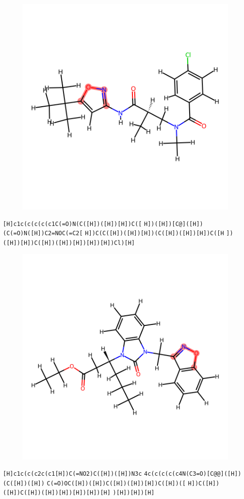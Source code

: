 \documentclass{article}
\begin{document}
\begin{figure}[ht]
\centering
    \includegraphics{mol208.png}
\end{figure}
\verb|[H]c1c(c(c(c(c1C(=O)N(C([H])([H])[H])C([| \verb|H])([H])[C@]([H])(C(=O)N([H])C2=NOC(=C2[| \verb|H])C(C([H])([H])[H])(C([H])([H])[H])C([H| \verb|])([H])[H])C([H])([H])[H])[H])[H])Cl)[H]|

\begin{figure}[ht]
\centering
    \includegraphics{mol209.png}
\end{figure}
\verb|[H]c1c(c(c2c(c1[H])C(=NO2)C([H])([H])N3c| \verb|4c(c(c(c(c4N(C3=O)[C@@]([H])(C([H])([H])| \verb|C(=O)OC([H])([H])C([H])([H])[H])C([H])([| \verb|H])C([H])([H])C([H])([H])[H])[H])[H])[H]| \verb|)[H])[H])[H]|
\end{document}
